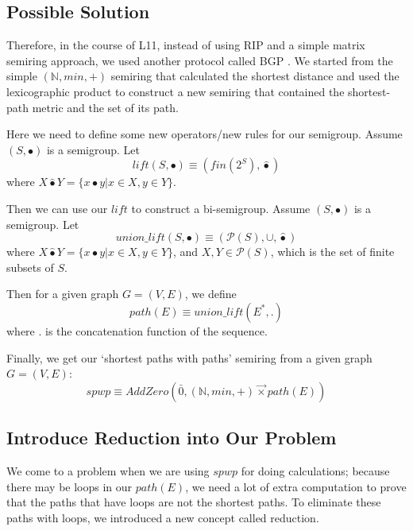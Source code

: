 \documentclass[a4paper,12pt,twoside,openright]{report}
\begin{document}
\subsection{Possible Solution}
Therefore, in the course of L11, instead of using RIP and a simple matrix semiring approach, we used another protocol called BGP \cite{rekhter_application_1991}. We started from the simple $(\mathbb{N},min,+)$ semiring that calculated the shortest distance and used the lexicographic product to construct a new semiring that contained the shortest-path metric and the set of its path.

Here we need to define some new operators/new rules for our semigroup.
Assume $(S,\bullet)$ is a semigroup. Let
\begin{equation}
  \label{eq:lift:def} 
  lift(S,\bullet) \equiv (fin(2^S),\hat\bullet)
\end{equation}   
where
$X \hat\bullet Y = \{x\bullet y |x\in X,y\in Y\}$.

Then we can use our $lift$ to construct a bi-semigroup.
Assume $(S,\bullet)$ is a semigroup. Let
\begin{equation}
  \label{eq:unionlift:def} 
  union\_lift(S,\bullet)\equiv (\mathcal{P}(S),\cup,\hat\bullet)
\end{equation}  
where
$X \hat\bullet Y = \{x\bullet y |x\in X,y\in Y\}$, and $X,Y \in \mathcal{P}(S)$, which is the set of finite subsets of $S$.

Then for a given graph $G = (V,E)$, we define
\begin{equation}
  \label{eq:path:def} 
  path(E)\equiv union\_lift(E^*,.) 
\end{equation}  
where . is the concatenation function of the sequence.

Finally, we get our ‘shortest paths with paths’ semiring from a given graph $G = (V,E)$: 
\begin{equation}
  \label{eq:spwp:def} 
  spwp \equiv AddZero(\bar0,(\mathbb{N},min,+) \overrightarrow{\times} path(E))
\end{equation} 

\subsection{Introduce Reduction into Our Problem}
We come to a problem when we are using $spwp$ for doing calculations; because there may be loops in our $path(E)$, we need a lot of extra computation to prove that the paths that have loops are not the shortest paths.
To eliminate these paths with loops, we introduced a new concept called reduction.
\end{document}
